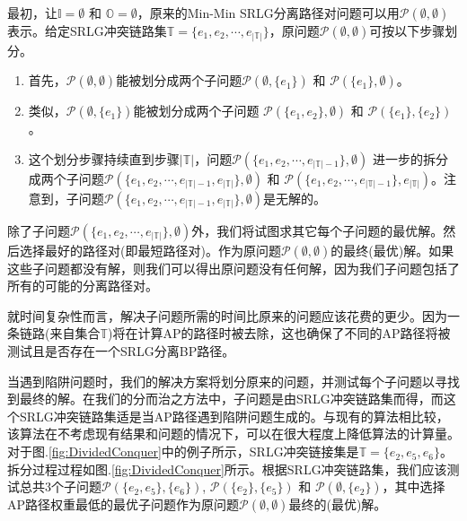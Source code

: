 最初，让$\mathbb{I}=\emptyset$ 和 ${\mathbb{O}}=\emptyset$，原来的Min-Min SRLG分离路径对问题可以用$\mathcal{P}(\emptyset,\emptyset)$表示。给定SRLG冲突链路集$\mathbb{T}=\{{e_1},{e_2}, \cdots ,{e_{\left| \mathbb{T} \right|}}\}$，原问题$\mathcal{P}(\emptyset,\emptyset)$可按以下步骤划分。

\begin{enumerate}
  \item 首先，$\mathcal{P}(\emptyset,\emptyset)$能被划分成两个子问题$\mathcal{P}(\emptyset,\{e_1\})$ 和 $\mathcal{P}(\{e_1\},\emptyset)$。
  \item 类似，$\mathcal{P}(\emptyset,\{e_1\})$能被划分成两个子问题 $\mathcal{P}(\{e_1,e_2\},\emptyset)$ 和 $\mathcal{P}(\{e_1\},\{e_2\})$。
  \item 这个划分步骤持续直到步骤$|\mathbb{T}|$，问题$\mathcal{P}(\{e_1,e_2,\cdots ,{e_{\left| \mathbb{T} \right|-1}}\},\emptyset)$ 进一步的拆分成两个子问题$\mathcal{P}(\{e_1,e_2,\cdots ,{e_{\left| \mathbb{T} \right|-1}}, {e_{\left| \mathbb{T} \right|}}\},\emptyset)$ 和 $\mathcal{P}(\{e_1,e_2,\cdots ,{e_{\left| \mathbb{T} \right|-1}}\},{e_{\left| \mathbb{T} \right|}})$。注意到，子问题$\mathcal{P}(\{e_1,e_2,\cdots ,{e_{\left| \mathbb{T} \right|-1}}, {e_{\left| \mathbb{T} \right|}}\},\emptyset)$是无解的。
\end{enumerate}



除了子问题$\mathcal{P}(\{e_1,e_2,\cdots ,{e_{\left| \mathbb{T} \right|}}\},\emptyset)$外，我们将试图求其它每个子问题的最优解。然后选择最好的路径对(即最短路径对)。作为原问题$\mathcal{P}(\emptyset,\emptyset)$的最终(最优)解。如果这些子问题都没有解，则我们可以得出原问题没有任何解，因为我们子问题包括了所有的可能的分离路径对。

就时间复杂性而言，解决子问题所需的时间比原来的问题应该花费的更少。因为一条链路(来自集合$\mathbb{T}$)将在计算AP的路径时被去除，这也确保了不同的AP路径将被测试且是否存在一个SRLG分离BP路径。

当遇到陷阱问题时，我们的解决方案将划分原来的问题，并测试每个子问题以寻找到最终的解。在我们的分而治之方法中，子问题是由SRLG冲突链路集而得，而这个SRLG冲突链路集适是当AP路径遇到陷阱问题生成的。与现有的算法相比较，该算法在不考虑现有结果和问题的情况下，可以在很大程度上降低算法的计算量。对于图.\ref{fig:DividedConquer}中的例子所示，SRLG冲突链接集是$\mathbb{T}=\{e_2,e_5,e_6\}$。拆分过程过程如图.\ref{fig:DividedConquer}所示。根据SRLG冲突链路集，我们应该测试总共3个子问题${{\mathcal{P}}(\{ e_2,e_5\} ,\{ e_6\} )}$, ${{\mathcal{P}}(\{ e_2\} ,\{ e_5\} )}$ 和 ${{\mathcal{P}}(\emptyset ,\{ e_2\} )}$，其中选择AP路径权重最低的最优子问题作为原问题$\mathcal{P}(\emptyset,\emptyset)$最终的(最优)解。

